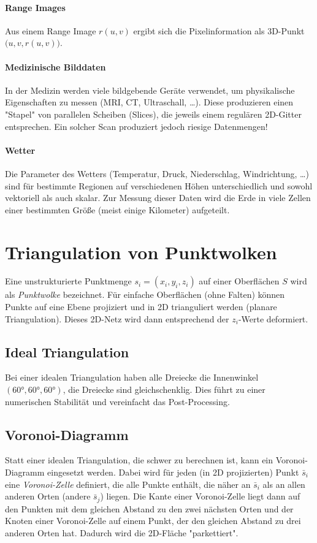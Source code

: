 			\paragraph{Range Images}
				Aus einem Range Image \( r(u, v) \) ergibt sich die Pixelinformation als 3D-Punkt \( \big(u, v, r(u, v)\big) \).

			\paragraph{Medizinische Bilddaten}
				In der Medizin werden viele bildgebende Geräte verwendet, um physikalische Eigenschaften zu messen (MRI, CT, Ultraschall, \dots). Diese produzieren einen "Stapel" von parallelen Scheiben (Slices), die jeweils einem regulären 2D-Gitter entsprechen. Ein solcher Scan produziert jedoch riesige Datenmengen!

			\paragraph{Wetter}
				Die Parameter des Wetters (\zB Temperatur, Druck, Niederschlag, Windrichtung, \dots) sind für bestimmte Regionen auf verschiedenen Höhen unterschiedlich und sowohl vektoriell als auch skalar. Zur Messung dieser Daten wird die Erde in viele Zellen einer bestimmten Größe (meist einige Kilometer) aufgeteilt.

		\section{Triangulation von Punktwolken}
			Eine unstrukturierte Punktmenge \( s_i = (x_i, y_i, z_i) \) auf einer Oberflächen \(S\) wird als \emph{Punktwolke} bezeichnet. Für einfache Oberflächen (ohne Falten) können Punkte auf eine Ebene projiziert und in 2D trianguliert werden (planare Triangulation). Dieses 2D-Netz wird dann entsprechend der \(z_i\)-Werte deformiert.

			\subsection{Ideal Triangulation}
				Bei einer idealen Triangulation haben alle Dreiecke die Innenwinkel \( (\ang{60}, \ang{60}, \ang{60}) \), \dh die Dreiecke sind gleichschenklig. Dies führt zu einer numerischen Stabilität und vereinfacht das Post-Processing.

			\subsection{Voronoi-Diagramm}
				Statt einer idealen Triangulation, die schwer zu berechnen ist, kann ein Voronoi-Diagramm eingesetzt werden. Dabei wird für jeden (in 2D projizierten) Punkt \( \bar{s}_i \) eine \emph{Voronoi-Zelle} definiert, die alle Punkte enthält, die näher an \( \bar{s}_i \) als an allen anderen Orten (andere \( \bar{s}_j \)) liegen. Die Kante einer Voronoi-Zelle liegt dann auf den Punkten mit dem gleichen Abstand zu den zwei nächsten Orten und der Knoten einer Voronoi-Zelle auf einem Punkt, der den gleichen Abstand zu drei anderen Orten hat. Dadurch wird die 2D-Fläche "parkettiert".


